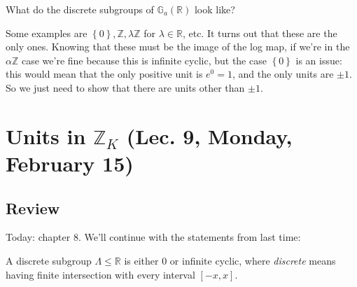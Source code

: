 \begin{question}

What do the discrete subgroups of \({\mathbb{G}}_a({\mathbb{R}})\) look
like?

\end{question}

\begin{answer}

Some examples are
\(\left\{{0}\right\}, {\mathbb{Z}}, \lambda {\mathbb{Z}}\) for
\(\lambda \in {\mathbb{R}}\), etc. It turns out that these are the only
ones. Knowing that these must be the image of the log map, if we're in
the \(\alpha{\mathbb{Z}}\) case we're fine because this is infinite
cyclic, but the case \(\left\{{ 0 }\right\}\) is an issue: this would
mean that the only positive unit is \(e^0 = 1\), and the only units are
\(\pm 1\). So we just need to show that there are units other than
\(\pm 1\).

\end{answer}

\hypertarget{units-in-mathbbz_k-lec.-9-monday-february-15}{%
\section{\texorpdfstring{Units in \({\mathbb{Z}}_K\) (Lec. 9, Monday,
February
15)}{Units in \{\textbackslash mathbb\{Z\}\}\_K (Lec. 9, Monday, February 15)}}\label{units-in-mathbbz_k-lec.-9-monday-february-15}}

\hypertarget{review}{%
\subsection{Review}\label{review}}

\begin{remark}

Today: chapter 8. We'll continue with the statements from last time:

\end{remark}

\begin{proposition}

A discrete subgroup \(\Lambda \leq {\mathbb{R}}\) is either \(0\) or
infinite cyclic, where \emph{discrete} means having finite intersection
with every interval \([-x, x]\).

\end{proposition}

